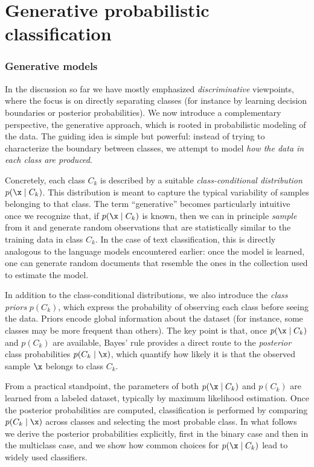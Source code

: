 
\chapter{Generative probabilistic classification}


\subsection*{Generative models}

In the discussion so far we have mostly emphasized \emph{discriminative} viewpoints, where the focus is on directly separating classes (for instance by learning decision boundaries or posterior probabilities). We now introduce a complementary perspective, the \alert{generative approach}, which is rooted in probabilistic modeling of the data. The guiding idea is simple but powerful: instead of trying to characterize the boundary between classes, we attempt to model \emph{how the data in each class are produced}.

Concretely, each class $C_k$ is described by a suitable \emph{class-conditional distribution} $p(\x \mid C_k)$. This distribution is meant to capture the typical variability of samples belonging to that class. The term ``generative'' becomes particularly intuitive once we recognize that, if $p(\x \mid C_k)$ is known, then we can in principle \emph{sample} from it and generate random observations that are statistically similar to the training data in class $C_k$. In the case of text classification, this is directly analogous to the language models encountered earlier: once the model is learned, one can generate random documents that resemble the ones in the collection used to estimate the model.

In addition to the class-conditional distributions, we also introduce the \emph{class priors} $p(C_k)$, which express the probability of observing each class before seeing the data. Priors encode global information about the dataset (for instance, some classes may be more frequent than others). The key point is that, once $p(\x \mid C_k)$ and $p(C_k)$ are available, Bayes' rule provides a direct route to the \emph{posterior} class probabilities $p(C_k \mid \x)$, which quantify how likely it is that the observed sample $\x$ belongs to class $C_k$.

From a practical standpoint, the parameters of both $p(\x \mid C_k)$ and $p(C_k)$ are learned from a labeled dataset, typically by maximum likelihood estimation. Once the posterior probabilities are computed, classification is performed by comparing $p(C_k \mid \x)$ across classes and selecting the most probable class. In what follows we derive the posterior probabilities explicitly, first in the binary case and then in the multiclass case, and we show how common choices for $p(\x \mid C_k)$ lead to widely used classifiers.

